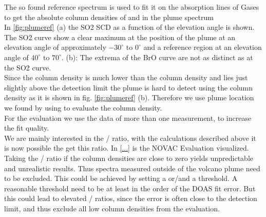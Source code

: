 \documentclass  [
  paper    = a4,
  BCOR     = 10mm,
  twoside,
  fontsize = 12pt,
  fleqn,
  toc      = bibnumbered,
  toc      = listofnumbered,
  numbers  = noendperiod,
  headings = normal,
  listof   = leveldown,
  version  = 3.03
]                                       {scrreprt}
\begin{document}
	The so found reference spectrum is used to fit it on the  absorption lines of Gases to get the absolute column densities of  and  in the plume spectrum\\
	In \cref{fig:plumeref} (a) the SO2 SCD as a function of the elevation angle is shown. The SO2 curve show a clear maximum at the position of the plume at an elevation angle of approximately $-30^{\circ}$ to $0^{\circ}$  and a reference region at an elevation angle of $40^{\circ}$ to $70^{\circ}$. (b): The extrema of the BrO curve are not as distinct as at the SO2 curve. \\
	Since the  column density is much lower than the  column density and lies just slightly above the detection limit the plume is hard to detect using the  column density as it is shown in fig. \ref{fig:plumeref} (b). 
	Therefore we use plume location we found by using  to evaluate the  column density.\\
	For the evaluation we use the data of more than one measurement, to increase the fit quality.\\
	We are mainly interested in the / ratio, with the calculations described above it is now possible the get this ratio.
	In \cref{...} is the NOVAC Evaluation visualized.\\
	Taking the / ratio if the column densities are close to zero yields unpredictable and unrealistic results. Thus spectra measured outside of the volcano plume need to be excluded.
	This could be achieved by setting a  or/and a  threshold. A reasonable  threshold need to be at least in the order of the DOAS fit error. But this could lead to elevated / ratios, since the  error is often close to the detection limit, and thus exclude all low  column densities from the evaluation.
\end{document}
